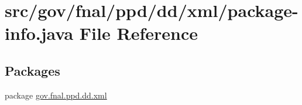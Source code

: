 \hypertarget{dd_2xml_2package-info_8java}{\section{src/gov/fnal/ppd/dd/xml/package-\/info.java File Reference}
\label{dd_2xml_2package-info_8java}
}
\subsection*{Packages}
\begin{DoxyCompactItemize}
\item 
package \hyperlink{namespacegov_1_1fnal_1_1ppd_1_1dd_1_1xml}{gov.\-fnal.\-ppd.\-dd.\-xml}
\end{DoxyCompactItemize}
